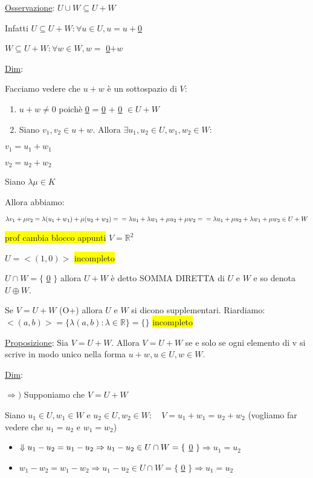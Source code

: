 \documentclass{article}
\newcommand{\hl}[1]{\colorbox{yellow}{#1}}
\newcommand{\ul}[1]{\underline{#1}}
\newcommand{\R}{\mathbb{R}}
\newcommand{\Def}[2]{\paragraph{\ul{Def}:}#1\\\hspace*{3em}\begin{minipage}{.8\textwidth}#2\end{minipage}}
\begin{document}
	\ul{Osservazione}: $U\cup W\subseteq U+W$

	Infatti $U\subseteq U+W:\forall u\in U,u=u+$\ul{0}

$W\subseteq U+W:\forall w\in W,w=$ \ul{0}$+w$

	\ul{Dim}:

	Facciamo vedere che $u+w$ è un sottospazio di $V$:
	\begin{enumerate}
		\item $u+w\not=0$ poichè \ul{0} = \ul{0} $+$ \ul{0} $\in U+W$
		\item Siano $v_1,v_2\in u+w$. Allora $\exists u_1,u_2\in U,w_1,w_2\in W:$
	\end{enumerate}

$v_1=u_1+w_1$

$v_2=u_2+w_2$

	Siano $\lambda\mu\in K$

	Allora abbiamo:

$\lambda v_1+\mu v_2=\lambda(u_1+w_1)+\mu(u_2+w_2)=\\=\lambda u_1+\lambda w_1+\mu u_2 + \mu w_2=\\=\lambda u_1+\mu u_2+\lambda w_1+\mu w_2\in U+W$

	\hl{prof cambia blocco appunti}
$V=\R^2$

$U=<(1,0)>$
	\hl{incompleto}


$U\cap W=\{$ \ul{0} $\}$ allora $U+W$ è detto SOMMA DIRETTA di $U$ e $W$ e so denota $U\oplus W$.

	Se $V=U+W$ (O+) allora $U$ e $W$ si dicono supplementari.
	\hrulefill
	Riardiamo: $<(a,b)>=\{\lambda(a,b):\lambda\in\R\}=\{\}$
	\hl{incompleto}

	\ul{Proposizione}: Sia $V=U+W$. Allora $V=U+W$ se e solo se ogni elemento di v si scrive in modo unico nella forma $u+w, u\in U, w\in W$.

	\ul{Dim}:

$\Rightarrow)$ Supponiamo che $V=U+W$

	Siano $u_1\in U,w_1\in W$ e $u_2\in U,w_2\in W:\quad V=u_1+w_1=u_2+w_2$ (vogliamo far vedere che $u_1=u_2$ e $w_1=w_2$)

	\begin{itemize}
		\item $\Downarrow\\u_1-u_2=u_1-u_2\Rightarrow u_1-u_2\in U\cap W=\{$ \ul{0} $\}\Rightarrow u_1=u_2$
		\item $w_1-w_2=w_1-w_2\Rightarrow u_1-u_2\in U\cap W=\{$ \ul{0} $\}\Rightarrow u_1=u_2$
	\end{itemize}
\end{document}
